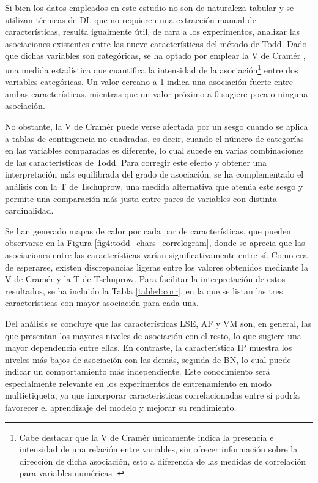 Si bien los datos empleados en este estudio no son de naturaleza tabular y se utilizan técnicas de DL que no requieren una extracción manual de características, resulta igualmente útil, de cara a los experimentos, analizar las asociaciones existentes entre las nueve características del método de Todd. Dado que dichas variables son categóricas, se ha optado por emplear la V de Cramér \cite{sheskin_handbook_2020}, una medida estadística que cuantifica la intensidad de la asociación\footnote{Cabe destacar que la V de Cramér únicamente indica la presencia e intensidad de una relación entre variables, sin ofrecer información sobre la dirección de dicha asociación, esto a diferencia de las medidas de correlación para variables numéricas \cite{jimenez_nota_2024}.} entre dos variables categóricas. Un valor cercano a 1 indica una asociación fuerte entre ambas características, mientras que un valor próximo a 0 sugiere poca o ninguna asociación.

No obstante, la V de Cramér puede verse afectada por un sesgo cuando se aplica a tablas de contingencia no cuadradas, es decir, cuando el número de categorías en las variables comparadas es diferente, lo cual sucede en varias combinaciones de las características de Todd. Para corregir este efecto y obtener una interpretación más equilibrada del grado de asociación, se ha complementado el análisis con la T de Tschuprow, una medida alternativa que atenúa este sesgo y permite una comparación más justa entre pares de variables con distinta cardinalidad.

Se han generado mapas de calor por cada par de características, que pueden observarse en la Figura \ref{fig4:todd_chars_correlogram}, donde se aprecia que las asociaciones entre las características varían significativamente entre sí. Como era de esperarse, existen discrepancias ligeras entre los valores obtenidos mediante la V de Cramér y la T de Tschuprow. Para facilitar la interpretación de estos resultados, se ha incluido la Tabla \ref{table4:corr}, en la que se listan las tres características con mayor asociación para cada una.

Del análisis se concluye que las características LSE, AF y VM son, en general, las que presentan los mayores niveles de asociación con el resto, lo que sugiere una mayor dependencia entre ellas. En contraste, la característica IP muestra los niveles más bajos de asociación con las demás, seguida de BN, lo cual puede indicar un comportamiento más independiente. Este conocimiento será especialmente relevante en los experimentos de entrenamiento en modo multietiqueta, ya que incorporar características correlacionadas entre sí podría favorecer el aprendizaje del modelo y mejorar su rendimiento.

